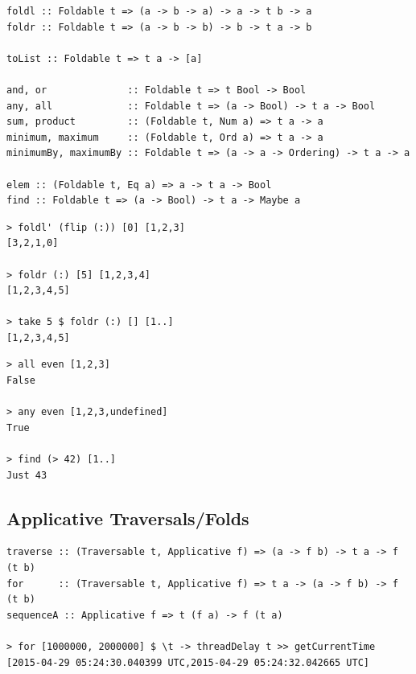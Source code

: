 \begin{box1}
\begin{multicols}{4}
\end{multicols}

\begin{verbatim}
foldl :: Foldable t => (a -> b -> a) -> a -> t b -> a	
foldr :: Foldable t => (a -> b -> b) -> b -> t a -> b	

toList :: Foldable t => t a -> [a]	

and, or              :: Foldable t => t Bool -> Bool	
any, all             :: Foldable t => (a -> Bool) -> t a -> Bool	
sum, product         :: (Foldable t, Num a) => t a -> a	
minimum, maximum     :: (Foldable t, Ord a) => t a -> a	
minimumBy, maximumBy :: Foldable t => (a -> a -> Ordering) -> t a -> a

elem :: (Foldable t, Eq a) => a -> t a -> Bool	
find :: Foldable t => (a -> Bool) -> t a -> Maybe a
\end{verbatim}

\begin{multicols}{2}
\begin{verbatim}
> foldl' (flip (:)) [0] [1,2,3]
[3,2,1,0]

> foldr (:) [5] [1,2,3,4]
[1,2,3,4,5]

> take 5 $ foldr (:) [] [1..]
[1,2,3,4,5]
\end{verbatim}

\columnbreak

\begin{verbatim}
> all even [1,2,3]
False

> any even [1,2,3,undefined]
True

> find (> 42) [1..]
Just 43
\end{verbatim}
\end{multicols}
\end{box1}

\begin{box2}
\subsection *{Applicative Traversals/Folds}

\begin{verbatim}
traverse :: (Traversable t, Applicative f) => (a -> f b) -> t a -> f (t b)
for      :: (Traversable t, Applicative f) => t a -> (a -> f b) -> f (t b)
sequenceA :: Applicative f => t (f a) -> f (t a)

> for [1000000, 2000000] $ \t -> threadDelay t >> getCurrentTime
[2015-04-29 05:24:30.040399 UTC,2015-04-29 05:24:32.042665 UTC]
\end{verbatim}
\end{box2}

